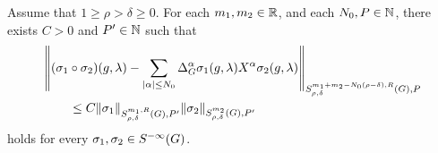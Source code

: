 \begin{proposition}
\label{proposition:composition_formula}
    Assume that $1 \geq \rho > \delta \geq 0$.
    For each $m_1, m_2 \in \mathbb{R}$, and each $N_0, P \in \mathbb{N}$,
    there exists $C > 0$ and $P' \in \mathbb{N}$ such that
    \begin{align*}
        &\SymbolSemiNorm {m_1 + m_2 - N_0 (\rho - \delta), R} {\rho, \delta} P {%
        (\sigma_1 \circ \sigma_2)(g, \lambda)
        - \sum_{\abs \alpha \leq N_0} \DifferenceOperatorOrder \alpha \sigma_1(g, \lambda) \LeftDifferentialOperator \alpha \sigma_2(g, \lambda)
        }\\
        &\qquad \leq C
        \SymbolSemiNorm {m_1, R} {\rho, \delta} {P'} {\sigma_1}
        \SymbolSemiNorm {m_2} {\rho, \delta} {P'} {\sigma_2}
    \end{align*}
    holds for every $\sigma_1, \sigma_2 \in {S^{-\infty} (G)}$.
\end{proposition}
